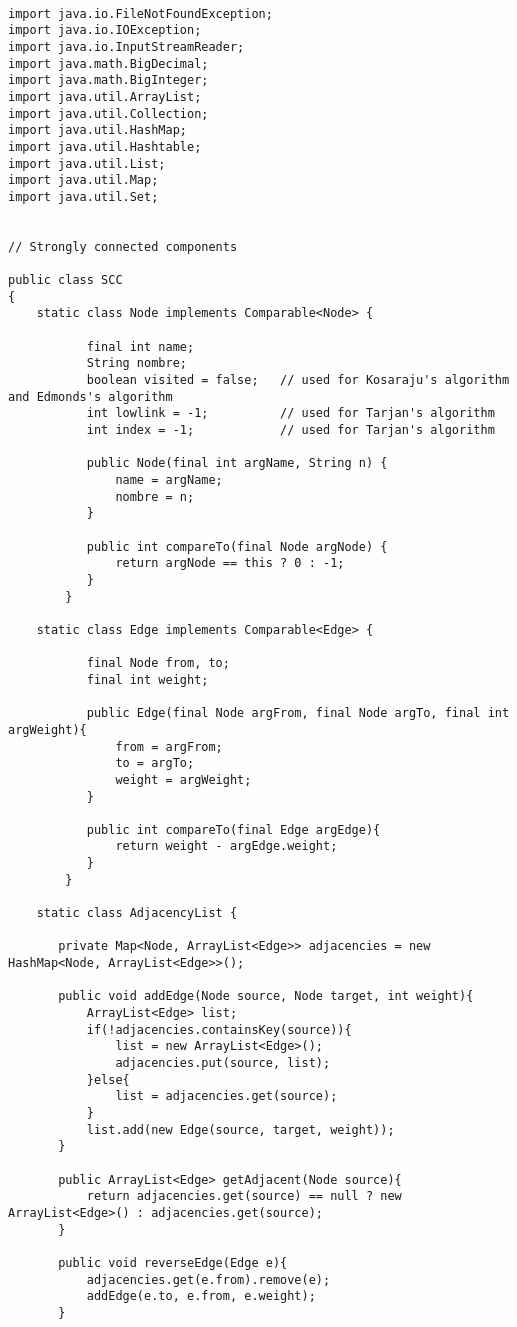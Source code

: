 \documentclass[a4paper, 11pt, oneside]{report}
\begin{document}
\begin{verbatim}

import java.io.FileNotFoundException;
import java.io.IOException;
import java.io.InputStreamReader;
import java.math.BigDecimal;
import java.math.BigInteger;
import java.util.ArrayList;
import java.util.Collection;
import java.util.HashMap;
import java.util.Hashtable;
import java.util.List;
import java.util.Map;
import java.util.Set;
	

// Strongly connected components

public class SCC
{
	static class Node implements Comparable<Node> {
		   
		   final int name;
		   String nombre;
		   boolean visited = false;   // used for Kosaraju's algorithm and Edmonds's algorithm
		   int lowlink = -1;          // used for Tarjan's algorithm
		   int index = -1;            // used for Tarjan's algorithm
		   
		   public Node(final int argName, String n) {
		       name = argName;
		       nombre = n;
		   }
		   
		   public int compareTo(final Node argNode) {
		       return argNode == this ? 0 : -1;
		   }
		}
	
	static class Edge implements Comparable<Edge> {
		   
		   final Node from, to;
		   final int weight;
		   
		   public Edge(final Node argFrom, final Node argTo, final int argWeight){
		       from = argFrom;
		       to = argTo;
		       weight = argWeight;
		   }
		   
		   public int compareTo(final Edge argEdge){
		       return weight - argEdge.weight;
		   }
		}

	static class AdjacencyList {

	   private Map<Node, ArrayList<Edge>> adjacencies = new HashMap<Node, ArrayList<Edge>>();

	   public void addEdge(Node source, Node target, int weight){
	       ArrayList<Edge> list;
	       if(!adjacencies.containsKey(source)){
	           list = new ArrayList<Edge>();
	           adjacencies.put(source, list);
	       }else{
	           list = adjacencies.get(source);
	       }
	       list.add(new Edge(source, target, weight));
	   }

	   public ArrayList<Edge> getAdjacent(Node source){
	       return adjacencies.get(source) == null ? new ArrayList<Edge>() : adjacencies.get(source);
	   }

	   public void reverseEdge(Edge e){
	       adjacencies.get(e.from).remove(e);
	       addEdge(e.to, e.from, e.weight);
	   }


\end{verbatim}
\end{document}
